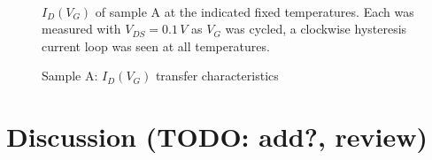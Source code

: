 \begin{figure}
\begin{centering}
{}
\par\end{centering}
\begin{centering}
~~~~
\par\end{centering}
\begin{centering}
\caption{Sample A: $I_{D}\left(V_{G}\right)$ transfer characteristics\label{fig:In2Se3-Sample-A-loops}}
\par\end{centering}
$I_{D}\left(V_{G}\right)$ of sample A at the indicated fixed temperatures.
Each was measured with $V_{DS}=0.1\,V$ as $V_{G}$ was cycled, a
clockwise hysteresis current loop was seen at all temperatures.
\end{figure}


\section{Discussion (TODO: add?, review)}

